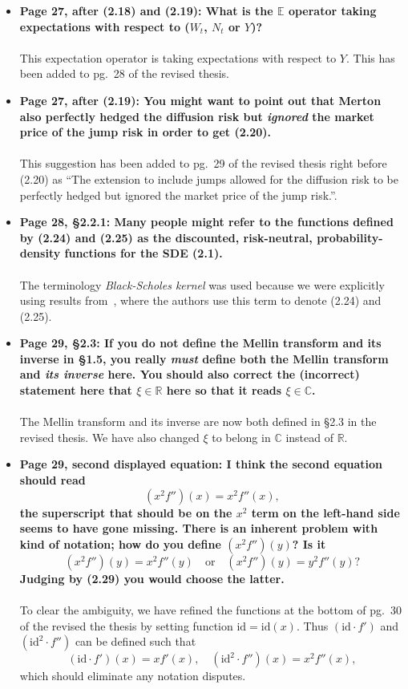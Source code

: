 \documentclass{article}
\begin{document}
\begin{enumerate}
\begin{itemize}
			\item{\textbf{Page 27, after (2.18) and (2.19): What is the $\mathbb{E}$ operator taking expectations with respect to ($W_t$, $N_t$ or $Y$)?\\\\}}
			This expectation operator is taking expectations with respect to $Y$. This has been added to pg.~28 of the revised thesis.
			\item{\textbf{Page 27, after (2.19): You might want to point out that Merton also perfectly hedged the diffusion risk but \emph{ignored} the market price of the jump risk in order to get (2.20).
			\\\\}}
			This suggestion has been added to pg.~29 of the revised thesis right before (2.20) as ``The extension to include jumps allowed for the diffusion risk to be perfectly hedged but ignored the market price of the jump risk.''.
			
			\item{\textbf{Page 28, \S2.2.1: Many people might refer to the functions defined by (2.24) and (2.25) as the discounted, risk-neutral, probability-density functions for the SDE (2.1).
			\\\\}}
			The terminology \emph{Black-Scholes kernel} was used because we were explicitly using results from~\cite{Rodrigo2006, Rodrigo2013}, where the authors use this term to denote (2.24) and (2.25).
			\item{\textbf{Page 29, \S2.3: If you do not define the Mellin transform and its inverse in \S1.5, you really \emph{must} define both the Mellin transform and \emph{its inverse} here. You should also correct the (incorrect) statement here that $\xi \in \mathbb{R}$ here so that it reads $\xi \in \mathbb{C}$.
			\\\\}}
			The Mellin transform and its inverse are now both defined in \S2.3 in the revised thesis. We have also changed $\xi$ to belong in $\mathbb{C}$ instead of $\mathbb{R}$.
			\item{\textbf{Page 29, second displayed equation: I think the second equation should read
				$$
					(x^2f'')(x) = x^2f''(x),
				$$
				the superscript that should be on the $x^2$ term on the left-hand side seems to have gone missing. There is an inherent problem with kind of notation; how do you define $(x^2f'')(y)$? Is it
				$$
					(x^2f'')(y) = x^2f''(y) \quad \text{or} \quad (x^2f'')(y) = y^2f''(y)?		
				$$
				Judging by (2.29) you would choose the latter.
			\\\\}}
			To clear the ambiguity, we have refined the functions at the bottom of pg.~30 of the revised the thesis by setting function $\text{id} = \text{id}(x)$. Thus $(\text{id}\cdot f')$ and $(\text{id}^2 \cdot f'')$ can be defined such that
			$$
				(\text{id}\cdot f')(x) = x f'(x), \quad (\text{id}^2\cdot f'')(x) = x^2 f''(x),
			$$
			which should eliminate any notation disputes.
			

\end{itemize}
\end{enumerate}
\end{document}
